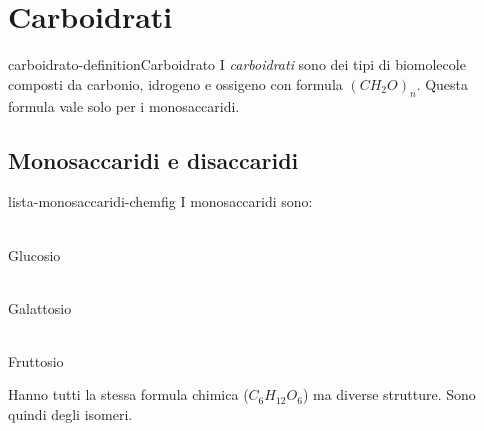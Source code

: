 \documentclass[preview]{standalone}
\begin{document}
\genpage

\section{Carboidrati}

\begin{snippetdefinition}{carboidrato-definition}{Carboidrato}
    I \textit{carboidrati} sono dei tipi di biomolecole composti da carbonio, idrogeno e ossigeno
    con formula \((CH_2O)_n\). Questa formula vale solo per i monosaccaridi.
\end{snippetdefinition}


\subsection{Monosaccaridi e disaccaridi}

\begin{snippet}{lista-monosaccaridi-chemfig}
    I monosaccaridi sono:\\
    \phantom{}

    \begin{minipage}{0.2\textwidth}
        \centering
         \phantom{}\\
        \hspace*{0.5cm} Glucosio
    \end{minipage}
    \hspace{3cm}
    \begin{minipage}{0.2\textwidth}
        \centering
         \phantom{}\\
            \hspace*{0.5cm} Galattosio
    \end{minipage}
    \hspace{3cm}
    \begin{minipage}{0.2\textwidth}
        \centering
         \phantom{}\\
            \hspace*{-0.5cm} Fruttosio
    \end{minipage}
    \vspace{1cm}

    Hanno tutti la stessa formula chimica (\(C_{6}H_{12}O_{6}\)) ma diverse strutture. Sono quindi degli isomeri.
\end{snippet}
\end{document}

